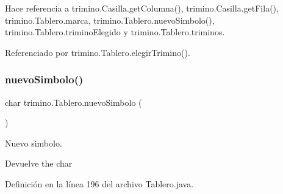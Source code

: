 \begin{DoxyCode}{0}
\end{DoxyCode}


Hace referencia a trimino.\+Casilla.\+get\+Columna(), trimino.\+Casilla.\+get\+Fila(), trimino.\+Tablero.\+marca, trimino.\+Tablero.\+nuevo\+Simbolo(), trimino.\+Tablero.\+trimino\+Elegido y trimino.\+Tablero.\+triminos.



Referenciado por trimino.\+Tablero.\+elegir\+Trimino().

\mbox{\label{classtrimino_1_1Tablero_a146790a6abfaef08ab62fb5b82cc3cd1}} 
\subsubsection{\texorpdfstring{nuevoSimbolo()}{nuevoSimbolo()}}
{\footnotesize\ttfamily char trimino.\+Tablero.\+nuevo\+Simbolo (\begin{DoxyParamCaption}{ }\end{DoxyParamCaption})}



Nuevo simbolo. 

\begin{DoxyReturn}{Devuelve}
the char 
\end{DoxyReturn}


Definición en la línea 196 del archivo Tablero.\+java.


